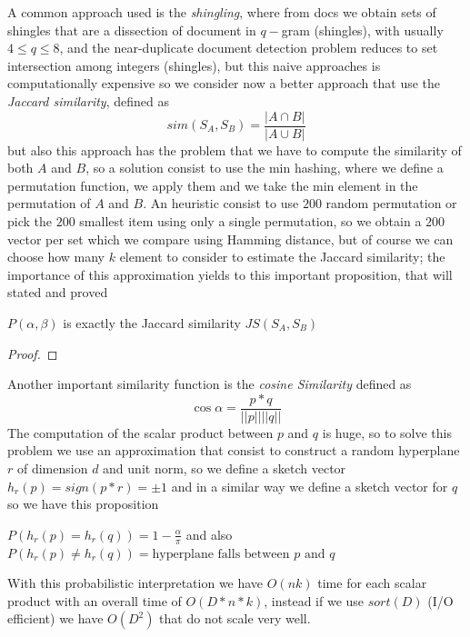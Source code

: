     A common approach used is the \emph{shingling}, where from docs we obtain sets of shingles that are a dissection of document in $q-$gram (shingles), with usually $4 \leq q \leq 8$,
    and the near-duplicate document detection problem reduces to set intersection among integers (shingles), but this naive approaches is computationally expensive so we consider now
    a better approach that use the \emph{Jaccard similarity}, defined as 
    \[ sim(S_A, S_B) = \frac{| A \cap B|}{|A \cup B|} \]
    but also this approach has the problem that we have to compute the similarity of both $A$ and $B$, so a solution consist to use the min hashing, where we define a permutation function,
    we apply them and we take the min element in the permutation of $A$ and $B$.\newline
    An heuristic consist to use $200$ random permutation or pick the $200$ smallest item using only a single permutation, so we obtain a $200$ vector per set which we compare using Hamming distance,
    but of course we can choose how many $k$ element to consider to estimate the Jaccard similarity; the importance of this approximation yields to this important proposition, that will stated and proved
    \begin{prop}
	    $P(\alpha, \beta)$ is exactly the Jaccard similarity $JS(S_A, S_B)$
    \end{prop}
    \begin{proof}

    \end{proof}
    Another important similarity function is the \emph{cosine Similarity} defined as 
    \[ \cos \alpha = \frac{p * q}{||p|| ||q||} \]
    The computation of the scalar product between $p$ and $q$ is huge, so to solve this problem we use an approximation that consist to construct a random hyperplane $r$ of dimension $d$ and unit norm,
    so we define a sketch vector $h_r(p) = sign(p * r) = \pm 1$ and in a similar way we define a sketch vector for $q$ so we have this proposition
    \begin{prop}
	    $P(h_r(p) = h_r(q)) = 1 - \frac{\alpha}{\pi}$ and also $P(h_r(p) \neq h_r(q)) = \text{hyperplane falls between } p \text{ and } q$
    \end{prop}
    With this probabilistic interpretation we have $O(nk)$ time for each scalar product with an overall time of $O(D * n * k)$, instead if we use $sort(D)$ (I/O efficient) 
    we have $O(D^2)$ that do not scale very well.



